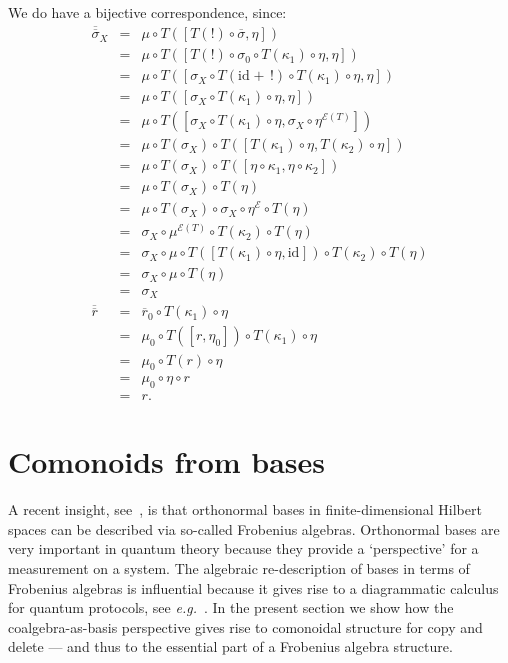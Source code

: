 \documentclass{LMCS}
\newcommand{\after}{\mathrel{\circ}}
\newcommand{\idmap}[1][]{\ensuremath{\mathrm{id}_{#1}}}
\newcommand{\E}{\ensuremath{\mathcal{E}}}
\begin{document}
{\noindent We do have a bijective correspondence, since:
$$\begin{array}{rcl}
\overline{\overline{\sigma}}_{X}
& = &
\mu \after T([T(!)\after \overline{\sigma}, \eta]) \\
& = &
\mu \after T([T(!)\after \sigma_{0} \after T(\kappa_{1}) \after \eta, 
   \eta]) \\
& = &
\mu \after T([\sigma_{X} \after T(\idmap+\,!) \after T(\kappa_{1})
    \after \eta, \eta]) \\
& = &
\mu \after T([\sigma_{X} \after T(\kappa_{1}) \after \eta, \eta]) \\
& = &
\mu \after T([\sigma_{X} \after T(\kappa_{1}) \after \eta, 
   \sigma_{X} \after \eta^{\E(T)}]) \\
& = &
\mu \after T(\sigma_{X}) \after T([T(\kappa_{1}) \after \eta, 
   T(\kappa_{2}) \after \eta]) \\
& = &
\mu \after T(\sigma_{X}) \after T([\eta \after \kappa_{1}, 
   \eta \after \kappa_{2}]) \\
& = &
\mu \after T(\sigma_{X}) \after T(\eta) \\
& = &
\mu \after T(\sigma_{X}) \after \sigma_{X} \after \eta^{\E}
   \after T(\eta) \\
& = &
\sigma_{X} \after \mu^{\E(T)} \after T(\kappa_{2}) \after
   T(\eta) \\
& = &
\sigma_{X} \after \mu \after T([T(\kappa_{1}) \after \eta, \idmap]) 
   \after T(\kappa_{2}) \after T(\eta) \\
& = &
\sigma_{X} \after \mu \after T(\eta) \\
& = &
\sigma_{X} \\
\overline{\overline{r}}
& = &
\overline{r}_{0} \after T(\kappa_{1}) \after \eta \\
& = &
\mu_{0} \after T([r, \eta_{0}]) \after T(\kappa_{1}) \after \eta \\
& = &
\mu_{0} \after T(r) \after \eta \\
& = &
\mu_{0} \after \eta \after r  \\
& = &
r.
\end{array}$$
}

\section{Comonoids from bases}\label{ComonoidSec}

A recent insight, see~\cite{CoeckePV12}, is that orthonormal bases in
finite-dimensional Hilbert spaces can be described via so-called
Frobenius algebras. Orthonormal bases are very important in quantum
theory because they provide a `perspective' for a measurement on a
system. The algebraic re-description of bases in terms of Frobenius
algebras is influential because it gives rise to a diagrammatic
calculus for quantum protocols, see \textit{e.g.}~\cite{Coecke10a}.
In the present section we show how the coalgebra-as-basis perspective
gives rise to comonoidal structure for copy and delete --- and thus to
the essential part of a Frobenius algebra structure.
\end{document}
